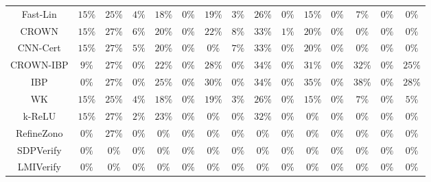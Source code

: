 \begin{table*}
{\begin{tabular}{c|c|c|c|c|c|c|c|c|c|c|c|c|c|c}
     Fast-Lin &        $15\%$ &        $25\%$ &         $4\%$ &        $18\%$ &         $0\%$ &        $19\%$ &         $3\%$ &        $26\%$ &         $0\%$ &        $15\%$ &         $0\%$ &         $7\%$ &         $0\%$ &         $0\%$ \\
        CROWN &        $15\%$ &        $27\%$ &         $6\%$ &        $20\%$ &         $0\%$ &        $22\%$ &         $8\%$ &        $33\%$ &         $1\%$ &        $20\%$ &         $0\%$ &         $0\%$ &         $0\%$ &         $0\%$ \\
     CNN-Cert &        $15\%$ &        $27\%$ &         $5\%$ &        $20\%$ &         $0\%$ &         $0\%$ &         $7\%$ &        $33\%$ &         $0\%$ &        $20\%$ &         $0\%$ &         $0\%$ &         $0\%$ &         $0\%$ \\
    CROWN-IBP &         $9\%$ &        $27\%$ &         $0\%$ &        $22\%$ &         $0\%$ &        $28\%$ &         $0\%$ &        $34\%$ &         $0\%$ &        $31\%$ &         $0\%$ &        $32\%$ &         $0\%$ &        $25\%$ \\
          IBP &         $0\%$ &        $27\%$ &         $0\%$ &        $25\%$ &         $0\%$ &        $30\%$ &         $0\%$ &        $34\%$ &         $0\%$ &        $35\%$ &         $0\%$ &        $38\%$ &         $0\%$ &        $28\%$ \\
           WK &        $15\%$ &        $25\%$ &         $4\%$ &        $18\%$ &         $0\%$ &        $19\%$ &         $3\%$ &        $26\%$ &         $0\%$ &        $15\%$ &         $0\%$ &         $7\%$ &         $0\%$ &         $5\%$ \\
       k-ReLU &        $15\%$ &        $27\%$ &         $2\%$ &        $23\%$ &         $0\%$ &         $0\%$ &         $0\%$ &        $32\%$ &         $0\%$ &         $0\%$ &         $0\%$ &         $0\%$ &         $0\%$ &         $0\%$ \\
   RefineZono &         $0\%$ &        $27\%$ &         $0\%$ &         $0\%$ &         $0\%$ &         $0\%$ &         $0\%$ &         $0\%$ &         $0\%$ &         $0\%$ &         $0\%$ &         $0\%$ &         $0\%$ &         $0\%$ \\
    SDPVerify &         $0\%$ &         $0\%$ &         $0\%$ &         $0\%$ &         $0\%$ &         $0\%$ &         $0\%$ &         $0\%$ &         $0\%$ &         $0\%$ &         $0\%$ &         $0\%$ &         $0\%$ &         $0\%$ \\
    LMIVerify &         $0\%$ &         $0\%$ &         $0\%$ &         $0\%$ &         $0\%$ &         $0\%$ &         $0\%$ &         $0\%$ &         $0\%$ &         $0\%$ &         $0\%$ &         $0\%$ &         $0\%$ &         $0\%$ \\

\end{tabular}}
\end{table*}
